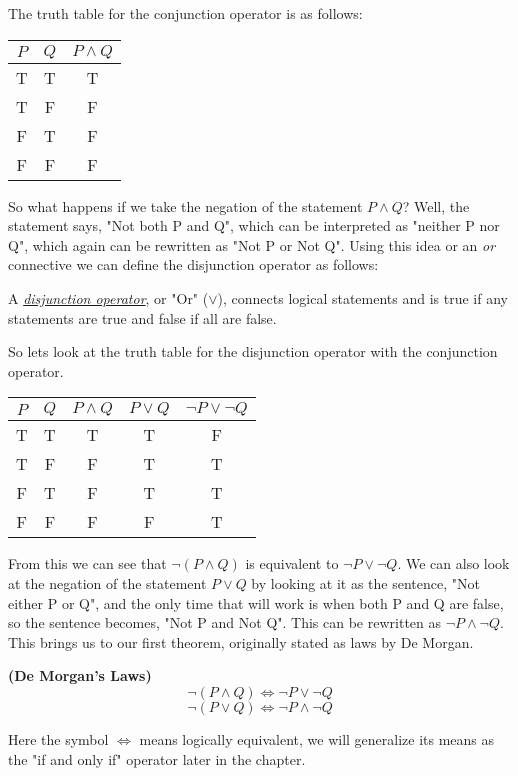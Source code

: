The truth table for the conjunction operator is as follows:
\begin{center}
	\begin{tabular}{cc|c}
		$P$ & $Q$ & $P \land Q$ \\
		\hline
		T & T & T \\
		T & F & F \\
		F & T & F \\
		F & F & F \\
	\end{tabular}
\end{center}

So what happens if we take the negation of the statement $P \land Q$?
Well, the statement says, "Not both P and Q", which can be interpreted as "neither P nor Q", which again can be rewritten as "Not P or Not Q".
Using this idea or an \emph{or} connective we can define the disjunction operator as follows:

\begin{defn}
	A \underline{\emph{disjunction operator}}, or "Or" ($\lor$), connects logical statements and is true if any statements are true and false if all are false.
\end{defn}

So lets look at the truth table for the disjunction operator with the conjunction operator.

\begin{center}
	\begin{tabular}{cc|ccc}
		$P$ & $Q$ & $P \land Q$ & $P \lor Q$ & $\neg P \lor \neg Q$ \\
		\hline
		T & T & T & T & F \\
		T & F & F & T & T \\
		F & T & F & T & T \\
		F & F & F & F & T \\
	\end{tabular}
\end{center}

From this we can see that $\neg (P \land Q)$ is equivalent to $\neg P \lor \neg Q$.
We can also look at the negation of the statement $P \lor Q$ by looking at it as the sentence, "Not either P or Q", and the only time that will work is when both P and Q are false, so the sentence becomes, "Not P and Not Q".
This can be rewritten as $\neg P \land \neg Q$.
This brings us to our first theorem, originally stated as laws by De Morgan.

\begin{thm}
	\textbf{(De Morgan's Laws)} \\
	\label{Thm:DeMorganLogic}
	\begin{equation}
		\nonumber
		\neg ( P \land Q ) \iff \neg P \lor \neg Q
	\end{equation}
	\begin{equation}
		\nonumber
		\neg ( P \lor Q ) \iff \neg P \land \neg Q
	\end{equation}
\end{thm}
Here the symbol $\iff$ means logically equivalent, we will generalize its means as the "if and only if" operator later in the chapter.

